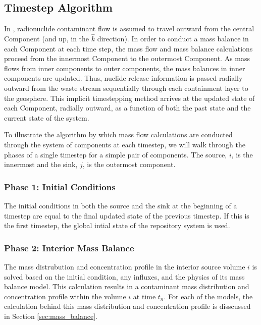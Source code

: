 \subsection{Timestep Algorithm}\label{sec:timestepping}

In \Cyder, radionuclide contaminant flow is assumed to travel outward from 
the central Component (and up, in the $\hat{k}$ direction). In order to conduct 
a mass balance in each Component at each time step, the mass flow and mass 
balance calculations proceed from the innermost Component to the outermost 
Component. As mass flows from inner components to outer components, the mass 
balances in inner components are updated.  Thus, nuclide release information is 
passed radially outward from the waste stream sequentially through each 
containment layer to the geosphere.  This implicit timestepping method 
arrives at the updated state of each Component, radially outward, as a function 
of both the past state and the current state of the system. 

To illustrate the algorithm by which mass flow calculations are conducted 
through the system of components at each timestep, we will walk through the 
phases of a single timestep for a simple pair of components. The source, $i$, 
is the innermost and the sink, $j$, is the outermost component. 

\subsubsection{Phase 1: Initial Conditions}

The initial conditions in both the source and the sink at the beginning of a 
timestep are equal to the final updated state of the previous timestep. If this 
is the first timestep, the global intial state of the repository system is used. 

\subsubsection{Phase 2: Interior Mass Balance}

The mass distrubution and concentration profile in the interior source volume 
$i$ is solved based on the initial condition, any influxes, and the physics of 
its mass balance model.  This calculation results in a contaminant mass 
distribution and concentration profile within the volume $i$ at time $t_n$.  
For each of the models, the calculation behind this mass distribution and 
concentration profile is disscussed in Section \ref{sec:mass_balance}.

